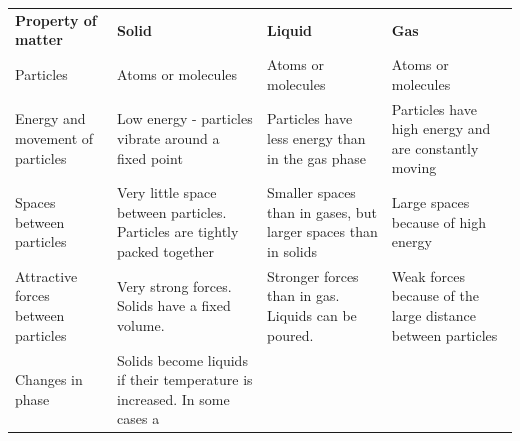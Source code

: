           \begin{table}[H]
        \begin{center}
      \label{m38730*uid40}
    \noindent
      \tablelasttail{}
      \begin{xtabular}[t]{|l|l|l|l|}\hline
                \textbf{Property of matter}
               &
                \textbf{Solid}
               &
                \textbf{Liquid}
               &
                \textbf{Gas}
     \tabularnewline{}
        Particles &
        Atoms or molecules &
        Atoms or molecules &
        Atoms or molecules%
     \tabularnewline{}
        Energy and movement of particles &
        Low energy - particles vibrate around a fixed point &
        Particles have less energy than in the gas phase &
        Particles have high energy and are constantly 
moving%
     \tabularnewline{}
        Spaces between particles &
        Very little space between particles. Particles are tightly 
packed together &
        Smaller spaces than in gases, but larger spaces than in 
solids &
        Large spaces because of high energy%
     \tabularnewline{}
        Attractive forces between particles &
        Very strong forces. Solids have a fixed volume. &
        Stronger forces than in gas. Liquids can be poured. &
        Weak forces because of the large distance between 
particles%
     \tabularnewline{}
        Changes in phase &
        Solids become liquids if their temperature is increased. In some cases a 

\end{xtabular}
\end{center}
\end{table}

